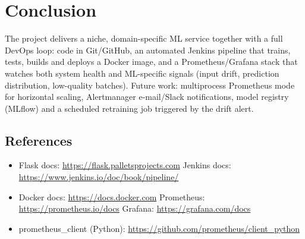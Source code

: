 \documentclass[10pt,a4paper]{article}
\let\oldsection\section
\renewcommand{\section}{\Needspace{14\baselineskip}\oldsection}
\begin{document}
\section{Conclusion}
The project delivers a niche, domain-specific ML service together with a full DevOps loop: code in Git/GitHub, an automated Jenkins pipeline that trains, tests, builds and deploys a Docker image,
and a Prometheus/Grafana stack that watches both system health and ML-specific signals (input drift, prediction distribution, low-quality batches).
Future work: multiprocess Prometheus mode for horizontal scaling, Alertmanager e-mail/Slack notifications, model registry (MLflow) and a scheduled retraining job triggered by the drift alert.

\subsection*{References}
\begin{itemize}[leftmargin=14pt]\small
\item Flask docs: \url{https://flask.palletsprojects.com} \quad Jenkins docs: \url{https://www.jenkins.io/doc/book/pipeline/}
\item Docker docs: \url{https://docs.docker.com} \quad Prometheus: \url{https://prometheus.io/docs} \quad Grafana: \url{https://grafana.com/docs}
\item prometheus\_client (Python): \url{https://github.com/prometheus/client_python}
\end{itemize}
\end{document}
